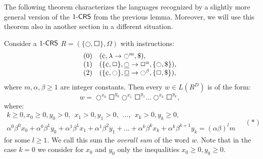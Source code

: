 The following theorem characterizes the languages recognized by a slightly more general version of the $\kCRS[1]$ from the previous lemma. Moreover, we will use this theorem also in another section in a different situation.

\begin{theorem}\label{theorem:circle-square-theorem}
Consider a $\kCRS[1]$ $R = (\{\Circle, \Square\}, \Omega)$ with instructions:
$$
\begin{array}{l}
(0) \quad (\cent, \lambda \to \Circle^m, \$),\\
(1) \quad (\{\cent, \Square\}, \underline{\Circle} \to \Square^{\alpha}, \{\Circle, \$\})\text,\\
(2) \quad (\{\cent, \Circle\}, \underline{\Square} \to \Circle^{\beta}, \{\Square, \$\}),
\end{array}
$$
where $m, \alpha, \beta \ge 1$ are integer constants. Then every $w \in L(R^D)$ is of the form:\\
$$w = \Circle^{x_0} \Square^{y_0} \Circle^{x_1} \Square^{y_1} \ldots \Circle^{x_k} \Square^{y_k},$$
where:
$$
\begin{array}{c}
k \ge 0, x_0 \ge 0, y_0 > 0, \ \ x_1 > 0, y_1 > 0, \ \ \ldots, \ \ x_k > 0, y_k \ge 0,\\
\alpha^0 \beta^0 x_0 + \alpha^0 \beta^1 y_0 + \alpha^1 \beta^1 x_1 + \alpha^1 \beta^2 y_1 + \ldots +
\alpha^k \beta^k x_k + \alpha^k \beta^{k+1} y_k = (\alpha \beta)^l m
\end{array} \quad (*)
$$
for some $l \ge 1$. We call this sum the \emph{overall sum} of the word $w$. Note that in the case $k = 0$ we consider for $x_0$ and $y_0$ only the inequalities $x_0 \ge 0, y_0 \ge 0$.
\end{theorem}


